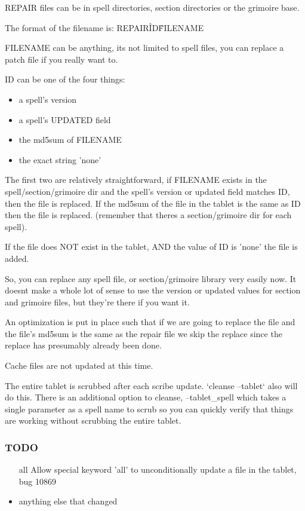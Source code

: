 \documentclass[a4paper,10pt]{book}
\begin{document}
REPAIR files can be in spell directories, section directories or the grimoire
base.

The format of the filename is: REPAIR\^ID\^FILENAME

FILENAME can be anything, its not limited to spell files, you can replace a
patch file if you really want to.

ID can be one of the four things:
\begin{itemize}
\item a spell's version
\item a spell's UPDATED field
\item the md5sum of FILENAME
\item the exact string 'none'
\end{itemize}

The first two are relatively straightforward, if FILENAME exists in the
spell/section/grimoire dir and the spell's version or updated field matches ID,
then the file is replaced. If the md5sum of the file in the tablet is the same
as ID then the file is replaced. (remember that theres a section/grimoire dir
for each spell).

If the file does NOT exist in the tablet, AND the value of ID is 'none' the
file is added.

So, you can replace any spell file, or section/grimoire library very easily
now. It doesnt make a whole lot of sense to use the version or updated values
for section and grimoire files, but they're there if you want it.

An optimization is put in place such that if we are going to replace the file
and the file's md5sum is the same as the repair file we skip the replace since
the replace has presumably already been done.

Cache files are not updated at this time.

The entire tablet is scrubbed after each scribe update. `cleanse --tablet` also
will do this. There is an additional option to cleanse, --tablet\_spell which
takes a single parameter as a spell name to scrub so you can quickly verify
that things are working without scrubbing the entire tablet.

\subsubsection{TODO}
\begin{itemize}
\item[all]
Allow special keyword 'all' to unconditionally update a file in the tablet, bug
10869
\item anything else that changed
\end{itemize}
\end{document}
